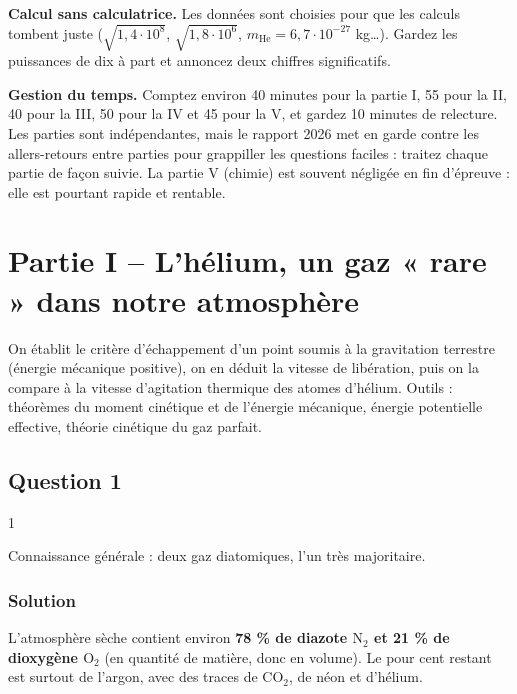 \documentclass[11pt,a4paper]{article}
\begin{document}
\textbf{Calcul sans calculatrice.} Les données sont choisies pour que les calculs tombent juste (\(\sqrt{1{,}4\cdot10^8}\), \(\sqrt{1{,}8\cdot10^6}\), \(m_{\text{He}}=6{,}7\cdot10^{-27}\) kg\ldots). Gardez les puissances de dix à part et annoncez deux chiffres significatifs.

\textbf{Gestion du temps.} Comptez environ 40 minutes pour la partie I, 55 pour la II, 40 pour la III, 50 pour la IV et 45 pour la V, et gardez 10 minutes de relecture. Les parties sont indépendantes, mais le rapport 2026 met en garde contre les allers-retours entre parties pour grappiller les questions faciles : traitez chaque partie de façon suivie. La partie V (chimie) est souvent négligée en fin d'épreuve : elle est pourtant rapide et rentable.

\hypertarget{partie-i-lhuxe9lium-un-gaz-rare-dans-notre-atmosphuxe8re}{%
\section{Partie I -- L'hélium, un gaz « rare » dans notre atmosphère}\label{partie-i-lhuxe9lium-un-gaz-rare-dans-notre-atmosphuxe8re}}

On établit le critère d'échappement d'un point soumis à la gravitation terrestre (énergie mécanique positive), on en déduit la vitesse de libération, puis on la compare à la vitesse d'agitation thermique des atomes d'hélium. Outils : théorèmes du moment cinétique et de l'énergie mécanique, énergie potentielle effective, théorie cinétique du gaz parfait.

\hypertarget{question-1}{%
\subsection{Question 1}\label{question-1}}

\begin{indication}{1}

Connaissance générale : deux gaz diatomiques, l'un très majoritaire.

\end{indication}

\hypertarget{solution}{%
\subsubsection{Solution}\label{solution}}

L'atmosphère sèche contient environ \textbf{78 \% de diazote \(\mathrm{N_2}\) et 21 \% de dioxygène \(\mathrm{O_2}\)} (en quantité de matière, donc en volume). Le pour cent restant est surtout de l'argon, avec des traces de \(\mathrm{CO_2}\), de néon et d'hélium.
\end{document}
